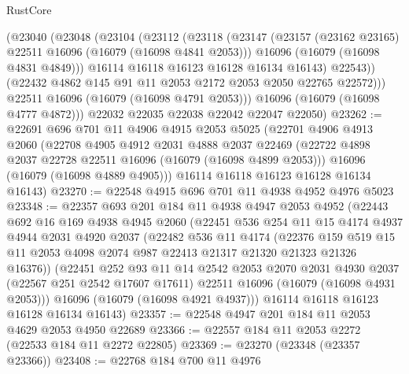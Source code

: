 \begin{lexlean}{RustCore}
\begin{coremodule}
          (@23040
            (@23048
              (@23104
                (@23112
                  (@23118
                    (@23147
                      (@23157 (@23162 @23165) @22511 @16096 (@16079 (@16098 @4841 @2053)))
                      @16096
                      (@16079 (@16098 @4831 @4849)))
                    @16114
                    @16118
                    @16123
                    @16128
                    @16134
                    @16143)
                  @22543))
              (@22432 @4862 @145 @91 @11 @2053 @2172 @2053 @2050 @22765 @22572)))
          @22511
          @16096
          (@16079 (@16098 @4791 @2053)))
        @16096
        (@16079 (@16098 @4777 @4872)))
      @22032
      @22035
      @22038
      @22042
      @22047
      @22050)
@23262 := @22691
    @696
    @701
    @11
    @4906
    @4915
    @2053
    @5025
    (@22701
      @4906
      @4913
      @2060
      (@22708
        @4905
        @4912
        @2031
        @4888
        @2037
        @22469
        (@22722 @4898 @2037 @22728 @22511 @16096 (@16079 (@16098 @4899 @2053)))
        @16096
        (@16079 (@16098 @4889 @4905)))
      @16114
      @16118
      @16123
      @16128
      @16134
      @16143)
@23270 := @22548 @4915 @696 @701 @11 @4938 @4952 @4976 @5023
@23348 := @22357
    @693
    @201
    @184
    @11
    @4938
    @4947
    @2053
    @4952
    (@22443
      @692
      @16
      @169
      @4938
      @4945
      @2060
      (@22451
        @536
        @254
        @11
        @15
        @4174
        @4937
        @4944
        @2031
        @4920
        @2037
        (@22482
          @536
          @11
          @4174
          (@22376
            @159
            @519
            @15
            @11
            @2053
            @4098
            @2074
            @987
            @22413
            @21317
            @21320
            @21323
            @21326
            @16376))
        (@22451
          @252
          @93
          @11
          @14
          @2542
          @2053
          @2070
          @2031
          @4930
          @2037
          (@22567 @251 @2542 @17607 @17611)
          @22511
          @16096
          (@16079 (@16098 @4931 @2053)))
        @16096
        (@16079 (@16098 @4921 @4937)))
      @16114
      @16118
      @16123
      @16128
      @16134
      @16143)
@23357 := @22548 @4947 @201 @184 @11 @2053 @4629 @2053 @4950 @22689
@23366 := @22557 @184 @11 @2053 @2272 (@22533 @184 @11 @2272 @22805)
@23369 := @23270 (@23348 (@23357 @23366))
@23408 := @22768
    @184
    @700
    @11
    @4976

\end{coremodule}
\end{lexlean}
